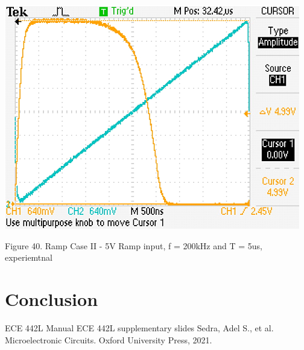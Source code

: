 \documentclass[conference]{IEEEtran}
\begin{document}
\begin{center}
    \centerline{\includegraphics[scale = 0.6]{figures/rampcase2_experimental.png}}
    Figure 40. Ramp Case II - 5V Ramp input, f = 200kHz and T = 5us, experiemtnal
\end{center} 

\section{Conclusion}

\begin{thebibliography}{00}
 ECE 442L Manual
 ECE 442L supplementary slides
 Sedra, Adel S., et al. Microelectronic Circuits. Oxford University Press, 2021.
\end{thebibliography}
\vspace{12pt}
\color{red}
\end{document}
